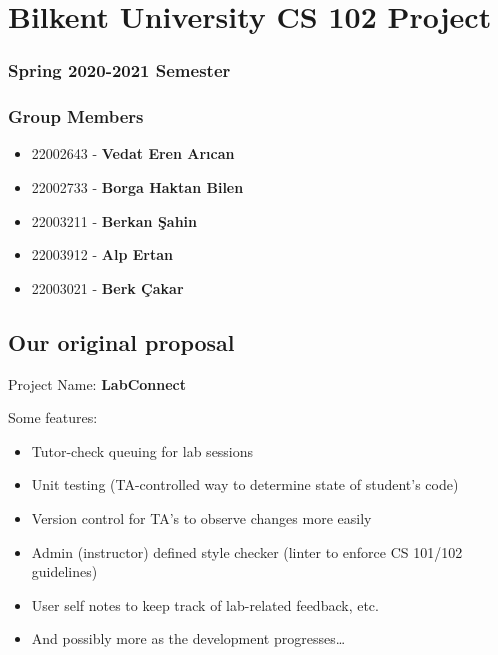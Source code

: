 \documentclass[12pt]{article}
\begin{document}
    \section*{Bilkent University CS 102
    Project}\label{bilkent-university-cs-102-project}
    
    \subsubsection*{Spring 2020-2021
    Semester}\label{spring-2020-2021-semester}
    
    \subsubsection*{Group Members}\label{group-members}
    
    \begin{itemize}
        \itemsep1pt\parskip0pt
        \item
          22002643 - \textbf{Vedat Eren Arıcan}
        \item
          22002733 - \textbf{Borga Haktan Bilen}
        \item
          22003211 - \textbf{Berkan Şahin}
        \item
          22003912 - \textbf{Alp Ertan}
        \item
          22003021 - \textbf{Berk Çakar}
    \end{itemize}
    
    \subsection*{Our original proposal}\label{our-original-proposal}
    
    Project Name: \textbf{LabConnect} \newline
    
    \noindent Some features: 
    
    \begin{itemize}
        \itemsep1pt\parskip0pt
        \item Tutor-check queuing for lab sessions
        \item Unit testing (TA-controlled way to determine state of student's code)
        \item Version control for TA's to observe changes more easily
        \item Admin (instructor) defined style checker (linter to enforce CS 101/102 guidelines)
        \item User self notes to keep track of lab-related feedback, etc.
        \item And possibly more as the development progresses\ldots{}
    \end{itemize}
    
\end{document}
